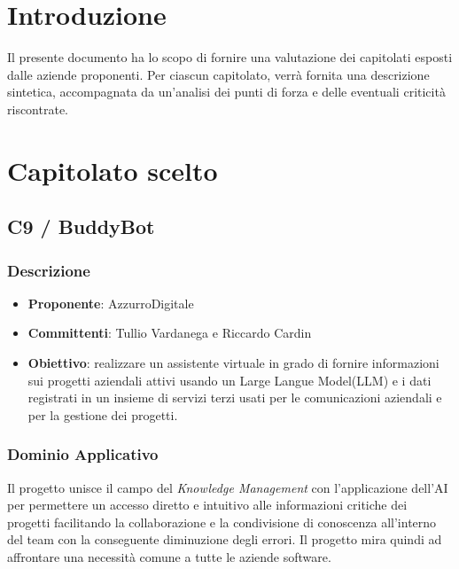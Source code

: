 \documentclass[a4paper, 12pt]{article}
\begin{document}
\section{Introduzione}
Il presente documento ha lo scopo di fornire una valutazione dei capitolati esposti dalle aziende proponenti.
Per ciascun capitolato, verrà fornita una descrizione sintetica, accompagnata da un’analisi dei punti di forza e delle eventuali criticità riscontrate.

\section{Capitolato scelto}

\subsection{C9 / BuddyBot}

\subsubsection{Descrizione}
\begin{itemize}
    \item \textbf{Proponente}: AzzurroDigitale
    \item \textbf{Committenti}: Tullio Vardanega e Riccardo Cardin
    \item \textbf{Obiettivo}: realizzare un assistente virtuale in grado di fornire informazioni sui progetti aziendali attivi usando un Large Langue Model(LLM) e i dati registrati in un insieme di servizi terzi usati per le comunicazioni aziendali e per la gestione dei progetti.
\end{itemize}

\subsubsection{Dominio Applicativo}
Il progetto unisce il campo del \textit{Knowledge Management} con l’applicazione dell’AI per permettere un accesso diretto e intuitivo alle informazioni critiche dei progetti facilitando la collaborazione e la condivisione di conoscenza all’interno del team con la conseguente diminuzione degli errori.
Il progetto mira quindi ad affrontare una necessità comune a tutte le aziende software.
\end{document}
